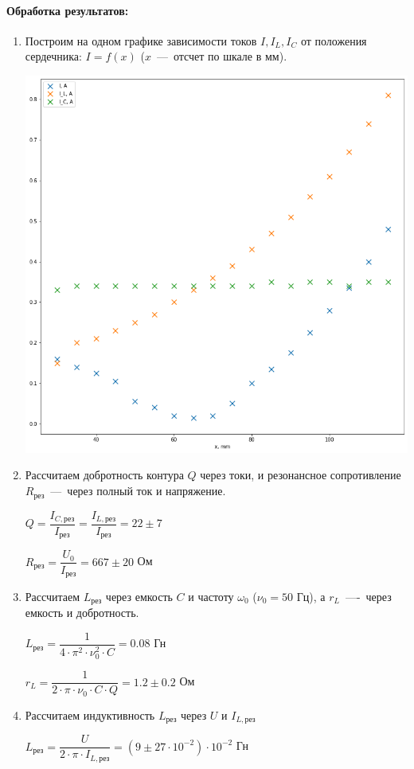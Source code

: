 \documentclass[a4paper, 12pt]{article}
\newcommand{\parag}[1]{\paragraph*{#1:}}
\begin{document}
\newpage

\parag{Обработка результатов} 

\begin{enumerate}
    \item Построим на одном графике зависимости токов $I, I_L, I_C$ от положения сердечника: $I = f(x)$ ($x$~---~отсчет по шкале в мм).
    
    \includegraphics[scale=0.5]{graph.png}
    
    \item Рассчитаем добротность контура $Q$ через токи, и резонансное сопротивление $R_{рез}$~---~через полный ток и напряжение.
    
    $Q = \dfrac{I_{C, рез}}{I_{рез}} = \dfrac{I_{L, рез}}{I_{рез}} = 22 \pm 7$

    $R_{рез} = \dfrac{U_0}{I_{рез}} = 667 \pm 20$ Ом

    \item Рассчитаем $L_{рез}$ через емкость $C$ и частоту $\omega_0$ ($\nu_0 = 50$ Гц), а $r_L$~----~через емкость и добротность.
    
    $L_{рез} = \dfrac{1}{4 \cdot \pi^2 \cdot \nu_0^2 \cdot C} = 0.08$ Гн
    
    $r_L = \dfrac{1}{2 \cdot \pi \cdot \nu_0 \cdot C \cdot Q} = 1.2 \pm 0.2$ Ом

    \item Рассчитаем индуктивность $L_{рез}$ через $U$ и $I_{L, рез}$
    
    $L_{рез} = \dfrac{U}{2 \cdot \pi \cdot I_{L, рез}} = (9 \pm 27 \cdot 10^{-2}) \cdot 10^{-2}$ Гн
\end{enumerate}
\end{document}
